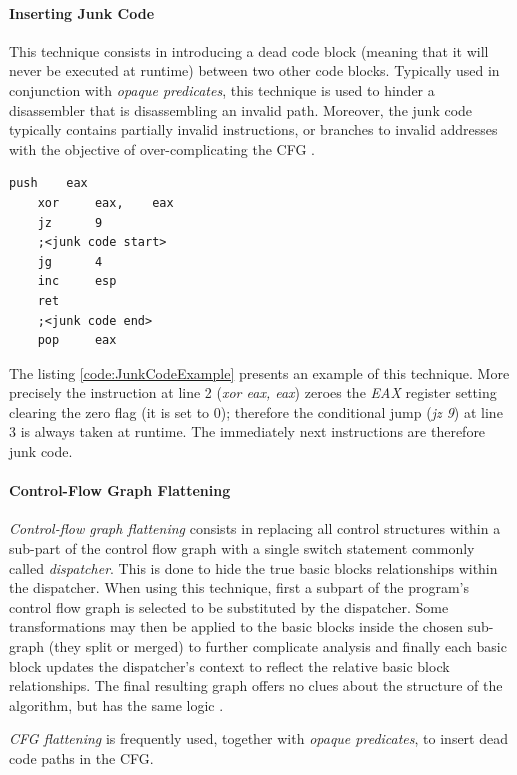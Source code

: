 \documentclass[pdfa%
,cucitura%
]{toptesi}
\begin{document}
\paragraph{Inserting Junk Code}
This technique consists in introducing a dead code block (meaning that it will never be executed at runtime) between two other code blocks. Typically used in conjunction with \textit{opaque predicates}, this technique is used to hinder a disassembler that is disassembling an invalid path. Moreover, the junk code typically contains partially invalid instructions, or branches to invalid addresses with the objective of over-complicating the CFG \cite{DangPRE}.

\begin{lstlisting}[caption={Junk Code example}, label=code:JunkCodeExample, language={[x86masm]Assembler}, style=mystyle]
	push	eax
	xor		eax,	eax
	jz		9
	;<junk code start>
	jg		4
	inc		esp
	ret
	;<junk code end>
	pop		eax
\end{lstlisting}

The listing \ref{code:JunkCodeExample} presents an example of this technique. More precisely the instruction at line 2 (\textit{xor eax, eax}) zeroes the \textit{EAX} register setting clearing the zero flag (it is set to 0); therefore the conditional jump (\textit{jz 9}) at line 3 is always taken at runtime. The immediately next instructions are therefore junk code.

\paragraph{Control-Flow Graph Flattening}
\textit{Control-flow graph flattening} consists in replacing all control structures within a sub-part of the control flow graph with a single switch statement commonly called \textit{dispatcher}. This is done to hide the true basic blocks relationships within the dispatcher. When using this technique, first a subpart of the program's control flow graph is selected to be substituted by the dispatcher. Some transformations may then be applied to the basic blocks inside the chosen sub-graph (they split or merged) to further complicate analysis and finally each basic block updates the dispatcher's context to reflect the relative basic block relationships. The final resulting graph offers no clues about the structure of the algorithm, but has the same logic \cite{DangPRE}.

\textit{CFG flattening} is frequently used, together with \textit{opaque predicates}, to insert dead code paths in the CFG.
\end{document}
